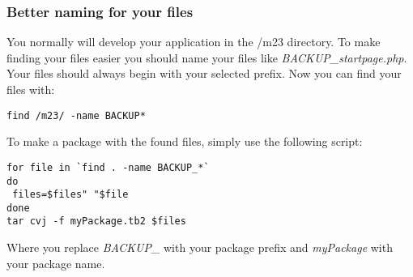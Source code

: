 \subsubsection{Better naming for your files}
You normally will develop your application in the /m23 directory. To make finding your files easier you should name your files like \textit{BACKUP\_startpage.php}. Your files should always begin with your selected prefix.
Now you can find your files with:
\begin{verbatim}
find /m23/ -name BACKUP*
\end{verbatim} 
To make a package with the found files, simply use the following script:
\begin{verbatim}
for file in `find . -name BACKUP_*`
do
 files=$files" "$file
done
tar cvj -f myPackage.tb2 $files
\end{verbatim}
Where you replace \textit{BACKUP\_} with your package prefix and \textit{myPackage} with your package name.
